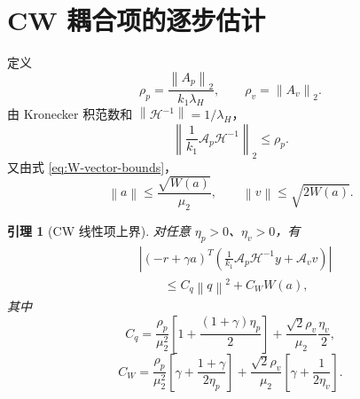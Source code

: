 \documentclass[UTF8,a4paper,12pt]{ctexart}
\newtheorem{lemma}{引理}
\newcommand{\norm}[1]{\left\lVert #1\right\rVert}
\newcommand{\abs}[1]{\left\lvert #1\right\rvert}
\newcommand{\cH}{\mathcal H}
\newcommand{\Ap}{\mathcal A_p}
\newcommand{\Av}{\mathcal A_v}
\begin{document}
\section{CW 耦合项的逐步估计}

定义
\begin{equation}
 \rho_p=\frac{\norm{A_p}_2}{k_1\lambda_H},\qquad
 \rho_v=\norm{A_v}_2.
\label{eq:rho-pv}
\end{equation}
由 Kronecker 积范数和 $\norm{\cH^{-1}}=1/\lambda_H$，
\begin{equation}
 \norm{\frac1{k_1}\Ap\cH^{-1}}_2\le\rho_p.
\end{equation}
又由式 \eqref{eq:W-vector-bounds}，
\begin{equation}
 \norm a\le\frac{\sqrt{W(a)}}{\mu_2},\qquad
 \norm v\le\sqrt{2W(a)}.
\label{eq:a-v-W}
\end{equation}

\begin{lemma}[CW 线性项上界]
对任意 $\eta_p>0$、$\eta_v>0$，有
\begin{equation}
\begin{aligned}
 &\abs{(-r+\gamma a)^T
 \left(\frac1{k_1}\Ap\cH^{-1}y+\Av v\right)}\\
 &\qquad\le C_q\norm q^2+C_WW(a),
\end{aligned}
\label{eq:CW-bound}
\end{equation}
其中
\begin{equation}
 C_q=
 \frac{\rho_p}{\mu_2^2}
 \left[1+\frac{(1+\gamma)\eta_p}{2}\right]
 +\frac{\sqrt2\rho_v}{\mu_2}\frac{\eta_v}{2},
\label{eq:Cq}
\end{equation}
\begin{equation}
 C_W=
 \frac{\rho_p}{\mu_2^2}
 \left[\gamma+\frac{1+\gamma}{2\eta_p}\right]
 +\frac{\sqrt2\rho_v}{\mu_2}
 \left[\gamma+\frac{1}{2\eta_v}\right].
\label{eq:CW}
\end{equation}
\end{lemma}
\end{document}
